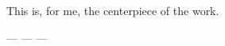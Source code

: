 \documentclass{article} %
\begin{document}
This is, for me, the centerpiece of the work. 

--- --- ---





\end{document}
